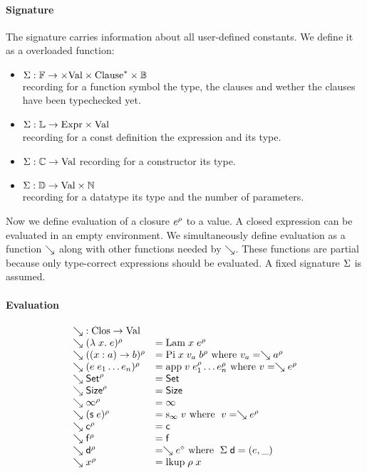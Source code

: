 \paragraph*{Signature}
The signature carries information about all user-defined constants.
We define it as a overloaded function:
\begin{itemize}
\item
$ \mathrm{\Sigma} : \mathbb{F} \rightarrow \times \mathrm{Val} \times {\mathrm{Clause}}^{\ast} \times \mathbb{B} $\\
recording for a function symbol the type, the clauses and wether the clauses have been typechecked yet.
\item
$ \mathrm{\Sigma} : \mathbb{L} \rightarrow \mathrm{Expr} \times \mathrm{Val} $ \\
recording for a const definition the expression and its type. 
\item
$ \mathrm{\Sigma} : \mathbb{C} \rightarrow \mathrm{Val} $
recording for a constructor its type.
\item
$ \mathrm{\Sigma} : \mathbb{D} \rightarrow \mathrm{Val} \times \mathbb{N} $\\
recording for a datatype its type and the number of parameters.
\end{itemize}

Now we define evaluation of a closure $e^{\rho}$ to a value. 
A closed expression can be evaluated in an empty environment.
We simultaneously define evaluation as a function $\searrow$ along with other functions needed by $\searrow$.     
These functions are partial because only type-correct expressions should be evaluated.
A fixed signature $\mathrm{\Sigma}$ is assumed.

\paragraph*{Evaluation}

\[
\begin{array}{ll}
\multicolumn{2}{l}{\wh \; : \Clos \ra \Val}\\
\wh \clp{\lam{x}{e}}{\rho} & = \vlam \; x \; \cl{e}{\rho} \\
\wh \clp{\EPi{x}{a}{b}}{\rho} &= \vpi \; x \; v_a \; \cl{b}{\rho} \mbox{ where } v_a = \wh \cl{a}{\rho} \\
\wh \clp{e \; e_1 \ldots e_n}{\rho} &= \ap \; v \; \cl{e_1}{\rho} \ldots \cl{e_n}{\rho} \mbox{ where } v = \wh \cl{e}{\rho} \\
\wh \cl{\Set}{\rho} & = \Set \\ 
\wh \cl{\Size}{\rho} & = \Size \\
\wh \cl{\infty}{\rho} & = \infty  \\
\wh \clp{\s e}{\rho} & = \sinfty \; v \mbox{ where } \; v = \wh \cl{e}{\rho} \\ 
\wh \cl{\cc}{\rho} & = \cc  \\
\wh \cl{\ff}{\rho} & = \ff \\
\wh \cl{\dd}{\rho} & = \wh \cl{e}{\diamond} \mbox{ where } \; \Sig \; \dd = (e,\_)\\
\wh \cl{x}{\rho} & = \lkup \; \rho \; x \\
\end{array}
\]

